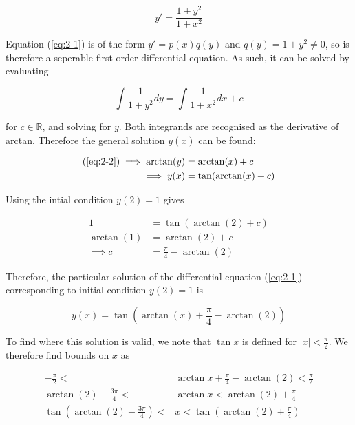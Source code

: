 \documentclass{article}
\begin{document}
\begin{equation} \label{eq:2-1}
    y' = \frac{1 + y^2}{1 + x^2}
\end{equation}

Equation (\ref{eq:2-1}) is of the form $y' = p(x)q(y)$ and $q(y) = 1 + y^2 \neq 0$, so is therefore a seperable first order differential equation. As such,
it can be solved by evaluating

\begin{equation} \label{eq:2-2}
    \int \frac{1}{1 + y^2}dy = \int \frac{1}{1 + x^2}dx + c
\end{equation}

for $c \in \mathbb{R}$, and solving for $y$. Both integrands are recognised as the derivative of arctan. Therefore the general solution $y(x)$ can be found:

\begin{align}
    (\ref{eq:2-2}) \implies \arctan (y) &= \arctan (x) + c \nonumber \\
    \implies y(x) &= \tan (\arctan (x) + c) \label{eq:2-3}
\end{align}

Using the intial condition $y(2) = 1$ gives

\begin{align}
    1 &= \tan (\arctan (2) + c) \nonumber \\
    \arctan (1) &= \arctan (2) + c \nonumber \\
    \implies c &= \frac{\pi}{4} - \arctan (2) \label{eq:2-4}
\end{align}

Therefore, the particular solution of the differential equation (\ref{eq:2-1}) corresponding to initial condition $y(2) = 1$ is

\begin{equation}
    y(x) = \tan (\arctan (x) + \frac{\pi}{4} - \arctan (2)) \label{eq:2-5}
\end{equation}

To find where this solution is valid, we note that $\tan x$ is defined for $|x| < \frac{\pi}{2}$. We therefore find bounds on $x$ as

\begin{align*}
    -\frac{\pi}{2} < &\arctan x + \frac{\pi}{4} - \arctan(2) < \frac{\pi}{2}\\
    \arctan(2) - \frac{3\pi}{4} < &\arctan x < \arctan(2) + \frac{\pi}{4}\\
    \tan\left(\arctan(2) - \frac{3\pi}{4}\right) < &x < \tan\left(\arctan(2) + \frac{\pi}{4}\right)\\
\end{align*}
\end{document}
